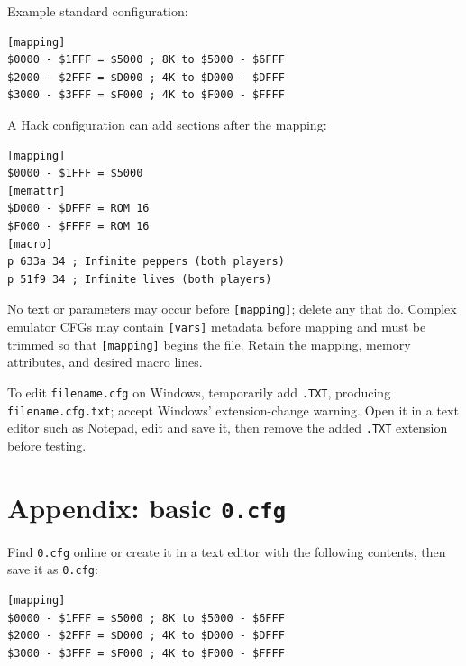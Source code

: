 \documentclass[a4paper,11pt]{article}
\newcommand{\file}[1]{\texttt{#1}}
\begin{document}
Example standard configuration:
\begin{verbatim}
[mapping]
$0000 - $1FFF = $5000 ; 8K to $5000 - $6FFF
$2000 - $2FFF = $D000 ; 4K to $D000 - $DFFF
$3000 - $3FFF = $F000 ; 4K to $F000 - $FFFF
\end{verbatim}

A Hack configuration can add sections after the mapping:
\begin{verbatim}
[mapping]
$0000 - $1FFF = $5000
[memattr]
$D000 - $DFFF = ROM 16
$F000 - $FFFF = ROM 16
[macro]
p 633a 34 ; Infinite peppers (both players)
p 51f9 34 ; Infinite lives (both players)
\end{verbatim}

No text or parameters may occur before \file{[mapping]}; delete any that do. Complex emulator CFGs may contain \file{[vars]} metadata before mapping and must be trimmed so that \file{[mapping]} begins the file. Retain the mapping, memory attributes, and desired macro lines.

To edit \file{filename.cfg} on Windows, temporarily add \file{.TXT}, producing \file{filename.cfg.txt}; accept Windows' extension-change warning. Open it in a text editor such as Notepad, edit and save it, then remove the added \file{.TXT} extension before testing.

\section*{Appendix: basic \file{0.cfg}}
Find \file{0.cfg} online or create it in a text editor with the following contents, then save it as \file{0.cfg}:
\begin{verbatim}
[mapping]
$0000 - $1FFF = $5000 ; 8K to $5000 - $6FFF
$2000 - $2FFF = $D000 ; 4K to $D000 - $DFFF
$3000 - $3FFF = $F000 ; 4K to $F000 - $FFFF
\end{verbatim}
\end{document}
